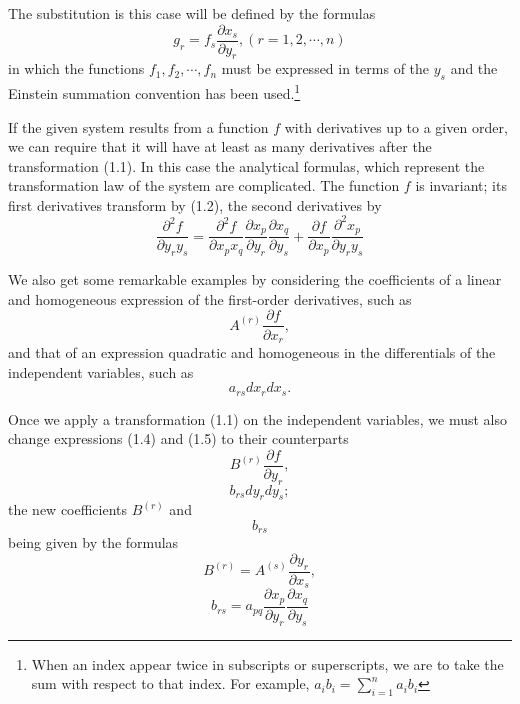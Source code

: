 \documentclass{book}
\begin{document}
The substitution is this case will be defined by the formulas
\begin{equation}
g_r=f_s\frac{\partial x_s}{\partial y_r}, (r=1,2,\cdots,n)
\end{equation}
in which the functions $f_1,f_2,\cdots,f_n$ must be expressed in terms of the $y_s$ and the Einstein summation convention has been used.\footnote{When an index appear twice in subscripts or superscripts, we are to take the sum with respect to that index. For example, $\displaystyle a_ib_i=\sum_{i=1}^n{a_ib_i}$}

If the given system results from a function $f$ with derivatives up to a given order, we can require that it will have at least as many derivatives after the transformation (1.1). In this case the analytical formulas, which represent the transformation law of the system are complicated. The function $f$ is invariant; its first derivatives transform by (1.2), the second derivatives by
\begin{equation}
\frac{\partial^2f}{\partial y_ry_s}=\frac{\partial^2f}{\partial x_px_q}\frac{\partial x_p}{\partial y_r}\frac{\partial x_q}{\partial y_s}+\frac{\partial f}{\partial x_p}\frac{\partial^2x_p}{\partial y_ry_s}
\end{equation}

We also get some remarkable examples by considering the coefficients of a linear and homogeneous expression of the  first-order derivatives, such as
\begin{equation}
A^{(r)}\frac{\partial f}{\partial x_r},
\end{equation}
and that of an expression quadratic and homogeneous in the differentials of the independent variables, such as
\begin{equation}
a_{rs}dx_rdx_s.
\end{equation}

Once we apply a transformation (1.1) on the independent variables, we must also change expressions (1.4) and (1.5) to their counterparts
$$B^{(r)}\frac{\partial f}{\partial y_r},$$
$$b_{rs}dy_rdy_s;$$
the new coefficients $B^{(r)}$ and $$b_{rs}$$ being given by the formulas
\begin{equation*}
\tag{$1.4'$}
B^{(r)}=A^{(s)}\frac{\partial y_r}{\partial x_s},
\end{equation*}	
\begin{equation*}
\tag{$1.5'$}
b_{rs}=a_{pq}\frac{\partial x_p}{\partial y_r}\frac{\partial x_q}{\partial y_s}
\end{equation*}
\end{document}
